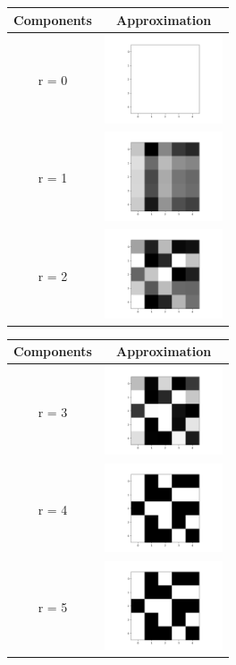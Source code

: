 \documentclass[a4paper,12pt]{article}
\begin{document}
	\begin{tabular}{|c|c|}
		\hline
		Components & Approximation \\
		\hline
		r = 0 & \includegraphics[width=3.5cm]{svd_approximation_0.png} \\
		\hline
		r = 1 & \includegraphics[width=3.5cm]{svd_approximation_1.png} \\
		\hline
		r = 2 & \includegraphics[width=3.5cm]{svd_approximation_2.png} \\
		\hline
	\end{tabular}
	\begin{tabular}{|c|c|}
		\hline
		Components & Approximation \\
		\hline
		r = 3 & \includegraphics[width=3.5cm]{svd_approximation_3.png} \\
		\hline
		r = 4 & \includegraphics[width=3.5cm]{svd_approximation_4.png} \\
		\hline
		r = 5 & \includegraphics[width=3.5cm]{svd_approximation_5.png} \\
		\hline
	\end{tabular}
\end{document}
